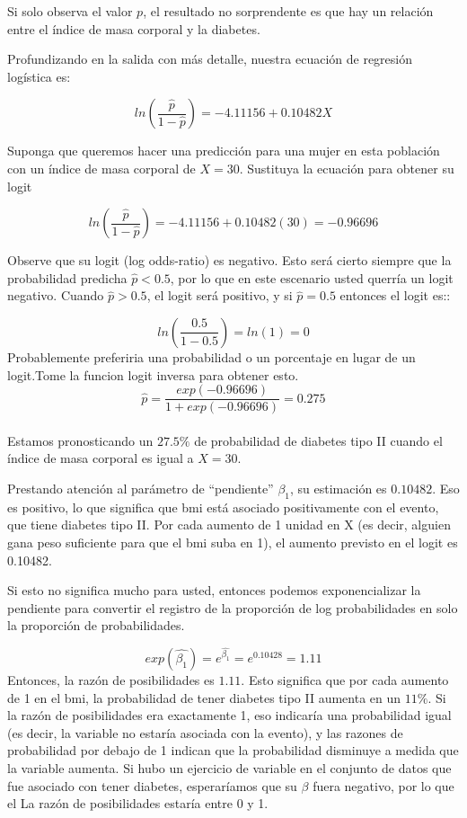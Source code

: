 \documentclass[
]{book}
\begin{document}
Si solo observa el valor \(p\), el resultado no sorprendente es que hay un relación entre el índice de masa corporal y la diabetes.

Profundizando en la salida con más detalle, nuestra ecuación de regresión logística es:

\[ ln(\frac{\hat{p}}{1-\hat{p}})=-4.11156+0.10482X \]

Suponga que queremos hacer una predicción para una mujer en esta población con un índice de masa corporal de \(X= 30\). Sustituya la ecuación para obtener su logit

\[
ln(\frac{\hat{p}}{1-\hat{p}})=-4.11156+0.10482(30)=-0.96696
\]

Observe que su logit (log odds-ratio) es negativo. Esto será cierto siempre que la probabilidad predicha \(\hat{p}<0.5\), por lo que en este escenario usted querría un logit negativo. Cuando \(\hat{p}>0.5\), el logit será positivo, y si \(\hat{p}= 0.5\) entonces el logit es::

\[
ln(\frac{0.5}{1-0.5})=ln(1)=0
\]
Probablemente preferiria una probabilidad o un porcentaje en lugar de un logit.Tome la funcion logit inversa para obtener esto.\\
\[\hat{p}=\frac{exp(-0.96696)}{1+exp(-0.96696)}=0.275 \]\\
Estamos pronosticando un \(27.5\%\) de probabilidad de diabetes tipo II cuando el índice de masa corporal es igual a \(X=30\).

Prestando atención al parámetro de ``pendiente'' \(\beta_1\), su estimación es \(0.10482\). Eso es positivo, lo que significa que bmi está asociado positivamente con el evento, que tiene diabetes tipo II. Por cada aumento de 1 unidad en X (es decir, alguien gana peso suficiente para que el bmi suba en 1), el aumento previsto en el logit es 0.10482.

Si esto no significa mucho para usted, entonces podemos exponencializar la pendiente para convertir el registro de la proporción de log probabilidades en solo la proporción de probabilidades.

\[exp(\hat{\beta_1})=e^{\hat{\beta_1}}=e^{0.10428}=1.11 \]
Entonces, la razón de posibilidades es \(1.11\). Esto significa que por cada aumento de 1 en el bmi, la probabilidad
de tener diabetes tipo II aumenta en un \(11\%\). Si la razón de posibilidades era exactamente 1, eso
indicaría una probabilidad igual (es decir, la variable no estaría asociada con la
evento), y las razones de probabilidad por debajo de 1 indican que la probabilidad disminuye a medida que la variable
aumenta. Si hubo un ejercicio de variable en el conjunto de datos que fue
asociado con tener diabetes, esperaríamos que su \(\beta\) fuera negativo, por lo que el
La razón de posibilidades estaría entre 0 y 1.
\end{document}
